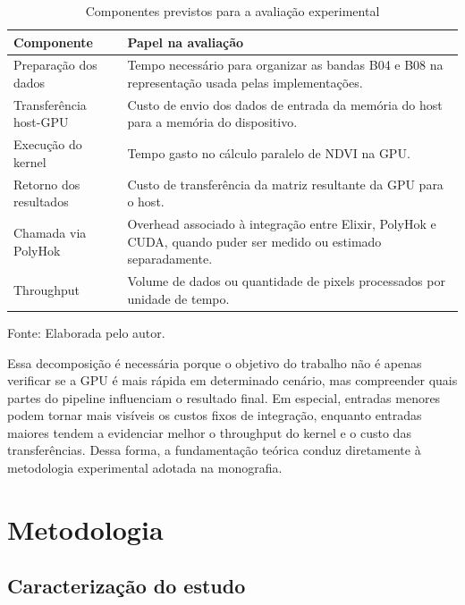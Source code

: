 \documentclass[tcc,capa]{texufpel}
\begin{document}
\begin{table}[H]
\caption{Componentes previstos para a avaliação experimental}\label{tab:fundamentacao-metricas}
\centering\begin{tabular}{p{4.6cm}p{9.4cm}}
\hline
Componente & Papel na avaliação\\
\hline
{\small Preparação dos dados} & {\small Tempo necessário para organizar as bandas B04 e B08 na representação usada pelas implementações.}\\
{\small Transferência \mbox{host-GPU}} & {\small Custo de envio dos dados de entrada da memória do host para a memória do dispositivo.}\\
{\small Execução do kernel} & {\small Tempo gasto no cálculo paralelo de NDVI na GPU.}\\
{\small Retorno dos resultados} & {\small Custo de transferência da matriz resultante da GPU para o host.}\\
{\small Chamada via PolyHok} & {\small Overhead associado à integração entre Elixir, PolyHok e CUDA, quando puder ser medido ou estimado separadamente.}\\
{\small Throughput} & {\small Volume de dados ou quantidade de pixels processados por unidade de tempo.}\\
\hline
\end{tabular}
\begin{flushleft}
{\small Fonte: Elaborada pelo autor.}
\end{flushleft}
\end{table}

Essa decomposição é necessária porque o objetivo do trabalho não é apenas verificar
se a GPU é mais rápida em determinado cenário, mas compreender quais partes do
pipeline influenciam o resultado final. Em especial, entradas menores podem tornar
mais visíveis os custos fixos de integração, enquanto entradas maiores tendem a
evidenciar melhor o throughput do kernel e o custo das transferências. Dessa forma,
a fundamentação teórica conduz diretamente à metodologia experimental adotada na
monografia.

\chapter{Metodologia}

\section{Caracterização do estudo}
\end{document}
